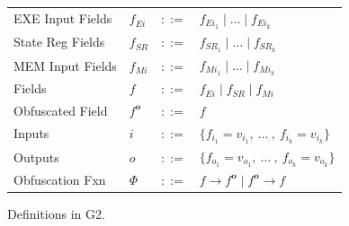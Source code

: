 \documentclass[sigconf,usenames,dvipsnames,svgnames,table]{acmart}
\newcommand{\obf}[1]{#1^\mathbf{o}}
\def \sysname {\textsc{G2}\xspace}
\begin{document}
        \begin{figure}
          \centering
          \begin{tabular}{l l c l}
            EXE Input Fields & $f_{Ei}$  & $::=$ & $f_{Ei_{1}} \mid \dots \mid f_{Ei_{k}}$\\
            State Reg Fields & $f_{SR}$  & $::=$ & $f_{SR_{1}} \mid \dots \mid f_{SR_{k}}$\\
            MEM Input Fields & $f_{Mi}$  & $::=$ & $f_{Mi_{1}} \mid \dots \mid f_{Mi_{k}}$\\
            Fields           & $f$       & $::=$ & $f_{Ei} \mid f_{SR} \mid f_{Mi} $ \\
            Obfuscated Field & $\obf{f}$ & $::=$ & $f$\\
            Inputs           & $i$       & $::=$ & $\{f_{i_{1}} = v_{i_{1}} ,\ \dots\ ,\ f_{i_{k}} = v_{i_{k}}\}$\\
            Outputs          & $o$       & $::=$ & $\{f_{o_{1}} = v_{o_{1}} ,\ \dots\ ,\ f_{o_{k}} = v_{o_{k}}\}$\\
            Obfuscation Fxn  & $\Phi$    & $::=$ & $f \rightarrow \obf{f} \mid \obf{f} \rightarrow f$
          \end{tabular}
          \caption{Definitions in \sysname.}
          \label{fig:spec:synt:defn}
        \end{figure}

\end{document}
